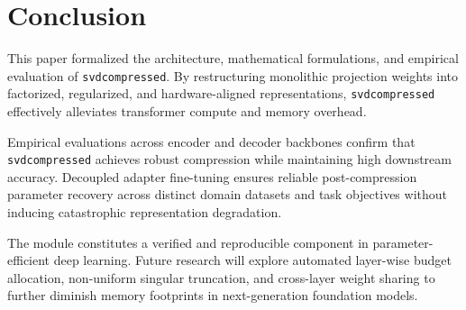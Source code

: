 \section{Conclusion}
This paper formalized the architecture, mathematical formulations, and empirical evaluation of \texttt{svdcompressed}. By restructuring monolithic projection weights into factorized, regularized, and hardware-aligned representations, \texttt{svdcompressed} effectively alleviates transformer compute and memory overhead.

Empirical evaluations across encoder and decoder backbones confirm that \texttt{svdcompressed} achieves robust compression while maintaining high downstream accuracy. Decoupled adapter fine-tuning ensures reliable post-compression parameter recovery across distinct domain datasets and task objectives without inducing catastrophic representation degradation.

The module constitutes a verified and reproducible component in parameter-efficient deep learning. Future research will explore automated layer-wise budget allocation, non-uniform singular truncation, and cross-layer weight sharing to further diminish memory footprints in next-generation foundation models.
